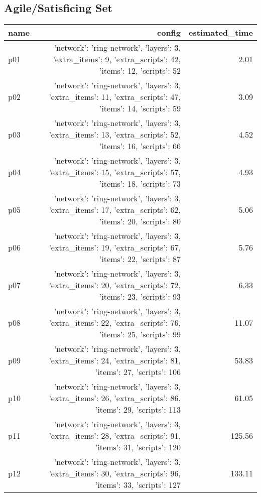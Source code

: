 \documentclass{article}
\begin{document}
                                \subsection*{Agile/Satisficing Set}
                                
                            \begin{center}
                            \scriptsize
                            \begin{tabular}{@{}l|r|r@{}}
                            name & config & estimated\_time\\\midrule
                              p01&{'network': 'ring-network', 'layers': 3, 'extra\_items': 9, 'extra\_scripts': 42, 'items': 12, 'scripts': 52}&2.01\\
  p02&{'network': 'ring-network', 'layers': 3, 'extra\_items': 11, 'extra\_scripts': 47, 'items': 14, 'scripts': 59}&3.09\\
  p03&{'network': 'ring-network', 'layers': 3, 'extra\_items': 13, 'extra\_scripts': 52, 'items': 16, 'scripts': 66}&4.52\\
  p04&{'network': 'ring-network', 'layers': 3, 'extra\_items': 15, 'extra\_scripts': 57, 'items': 18, 'scripts': 73}&4.93\\
  p05&{'network': 'ring-network', 'layers': 3, 'extra\_items': 17, 'extra\_scripts': 62, 'items': 20, 'scripts': 80}&5.06\\
  p06&{'network': 'ring-network', 'layers': 3, 'extra\_items': 19, 'extra\_scripts': 67, 'items': 22, 'scripts': 87}&5.76\\
  p07&{'network': 'ring-network', 'layers': 3, 'extra\_items': 20, 'extra\_scripts': 72, 'items': 23, 'scripts': 93}&6.33\\
  p08&{'network': 'ring-network', 'layers': 3, 'extra\_items': 22, 'extra\_scripts': 76, 'items': 25, 'scripts': 99}&11.07\\
  p09&{'network': 'ring-network', 'layers': 3, 'extra\_items': 24, 'extra\_scripts': 81, 'items': 27, 'scripts': 106}&53.83\\
  p10&{'network': 'ring-network', 'layers': 3, 'extra\_items': 26, 'extra\_scripts': 86, 'items': 29, 'scripts': 113}&61.05\\
  p11&{'network': 'ring-network', 'layers': 3, 'extra\_items': 28, 'extra\_scripts': 91, 'items': 31, 'scripts': 120}&125.56\\
  p12&{'network': 'ring-network', 'layers': 3, 'extra\_items': 30, 'extra\_scripts': 96, 'items': 33, 'scripts': 127}&133.11\\

\end{tabular}
\end{center}
\end{document}
